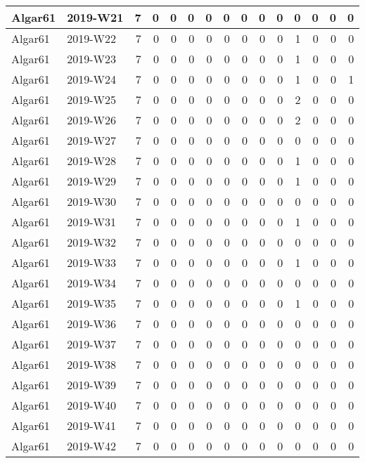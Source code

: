 \documentclass[]{book}
\begin{document}
\begin{table}
\begin{tabular}[t]{l|l|r|r|r|r|r|r|r|r|r|r|r|r|r}
\hline
Algar61 & 2019-W21 & 7 & 0 & 0 & 0 & 0 & 0 & 0 & 0 & 0 & 0 & 0 & 0 & 0\\
\hline
Algar61 & 2019-W22 & 7 & 0 & 0 & 0 & 0 & 0 & 0 & 0 & 0 & 1 & 0 & 0 & 0\\
\hline
Algar61 & 2019-W23 & 7 & 0 & 0 & 0 & 0 & 0 & 0 & 0 & 0 & 1 & 0 & 0 & 0\\
\hline
Algar61 & 2019-W24 & 7 & 0 & 0 & 0 & 0 & 0 & 0 & 0 & 0 & 1 & 0 & 0 & 1\\
\hline
Algar61 & 2019-W25 & 7 & 0 & 0 & 0 & 0 & 0 & 0 & 0 & 0 & 2 & 0 & 0 & 0\\
\hline
Algar61 & 2019-W26 & 7 & 0 & 0 & 0 & 0 & 0 & 0 & 0 & 0 & 2 & 0 & 0 & 0\\
\hline
Algar61 & 2019-W27 & 7 & 0 & 0 & 0 & 0 & 0 & 0 & 0 & 0 & 0 & 0 & 0 & 0\\
\hline
Algar61 & 2019-W28 & 7 & 0 & 0 & 0 & 0 & 0 & 0 & 0 & 0 & 1 & 0 & 0 & 0\\
\hline
Algar61 & 2019-W29 & 7 & 0 & 0 & 0 & 0 & 0 & 0 & 0 & 0 & 1 & 0 & 0 & 0\\
\hline
Algar61 & 2019-W30 & 7 & 0 & 0 & 0 & 0 & 0 & 0 & 0 & 0 & 0 & 0 & 0 & 0\\
\hline
Algar61 & 2019-W31 & 7 & 0 & 0 & 0 & 0 & 0 & 0 & 0 & 0 & 1 & 0 & 0 & 0\\
\hline
Algar61 & 2019-W32 & 7 & 0 & 0 & 0 & 0 & 0 & 0 & 0 & 0 & 0 & 0 & 0 & 0\\
\hline
Algar61 & 2019-W33 & 7 & 0 & 0 & 0 & 0 & 0 & 0 & 0 & 0 & 1 & 0 & 0 & 0\\
\hline
Algar61 & 2019-W34 & 7 & 0 & 0 & 0 & 0 & 0 & 0 & 0 & 0 & 0 & 0 & 0 & 0\\
\hline
Algar61 & 2019-W35 & 7 & 0 & 0 & 0 & 0 & 0 & 0 & 0 & 0 & 1 & 0 & 0 & 0\\
\hline
Algar61 & 2019-W36 & 7 & 0 & 0 & 0 & 0 & 0 & 0 & 0 & 0 & 0 & 0 & 0 & 0\\
\hline
Algar61 & 2019-W37 & 7 & 0 & 0 & 0 & 0 & 0 & 0 & 0 & 0 & 0 & 0 & 0 & 0\\
\hline
Algar61 & 2019-W38 & 7 & 0 & 0 & 0 & 0 & 0 & 0 & 0 & 0 & 0 & 0 & 0 & 0\\
\hline
Algar61 & 2019-W39 & 7 & 0 & 0 & 0 & 0 & 0 & 0 & 0 & 0 & 0 & 0 & 0 & 0\\
\hline
Algar61 & 2019-W40 & 7 & 0 & 0 & 0 & 0 & 0 & 0 & 0 & 0 & 0 & 0 & 0 & 0\\
\hline
Algar61 & 2019-W41 & 7 & 0 & 0 & 0 & 0 & 0 & 0 & 0 & 0 & 0 & 0 & 0 & 0\\
\hline
Algar61 & 2019-W42 & 7 & 0 & 0 & 0 & 0 & 0 & 0 & 0 & 0 & 0 & 0 & 0 & 0\\

\end{tabular}
\end{table}
\end{document}
